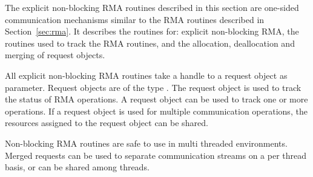 The explicit non-blocking \ac{RMA} routines described in this section are
one-sided communication mechanisms similar to the \ac{RMA} routines
described in Section~\ref{sec:rma}.
It describes the routines for: explicit non-blocking \ac{RMA},
the routines used to track the \ac{RMA} routines, and the
allocation, deallocation and merging of request objects.

All explicit non-blocking \ac{RMA} routines take a handle to a request
object as parameter. Request objects are of the type
. The request object is used to track the
status of \ac{RMA} operations. A request object can be used to track one
or more operations. If a request object is used for multiple
communication operations, the resources assigned to the request object
can be shared.

Non-blocking \ac{RMA} routines are safe to use in multi threaded
environments. Merged requests can be used to separate communication
streams on a per thread basis, or can be shared among threads.

